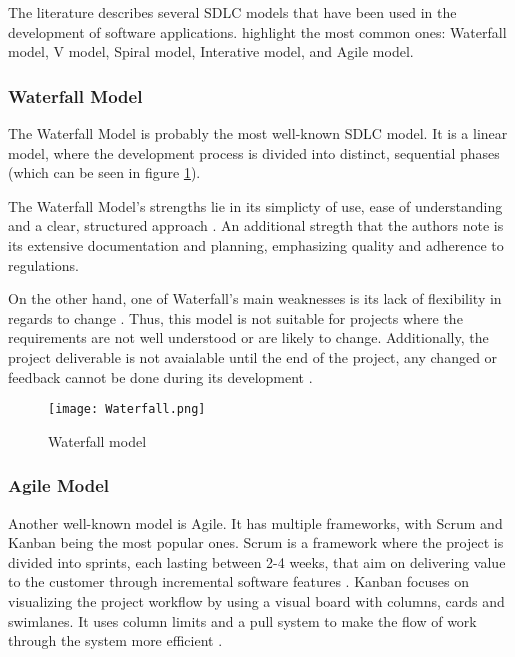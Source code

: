 The literature describes several SDLC models that have been used in the development of software applications. \textcite{sdlc1, sdlc2} highlight the most common ones: Waterfall model, V model, Spiral model, Interative model, and Agile model.

\subsubsection{Waterfall Model}

The Waterfall Model is probably the most well-known SDLC model. It is a linear model, where the development process is divided into distinct, sequential phases (which can be seen in figure \ref{fig:waterfall}).

The Waterfall Model's strengths lie in its simplicty of use, ease of understanding and a clear, structured approach \parencite{waterfall}. An additional stregth that the authors note is its extensive documentation and planning, emphasizing quality and adherence to regulations. 

On the other hand, one of Waterfall's main weaknesses is its lack of flexibility in regards to change \parencite{waterfallno}. Thus, this model is not suitable for projects where the requirements are not well understood or are likely to change. Additionally, the project deliverable is not avaialable until the end of the project, any changed or feedback cannot be done during its development \parencite{waterfallno}.

\begin{figure}[ht]
    \centering
    \texttt{[image: Waterfall.png]}
    \caption{Waterfall model}
    \label{fig:waterfall}
\end{figure}

\subsubsection{Agile Model}

Another well-known model is Agile. It has multiple frameworks, with Scrum and Kanban being the most popular ones. Scrum is a framework where the project is divided into sprints, each lasting between 2-4 weeks, that aim on delivering value to the customer through incremental software features \parencite{scrumban, agile}. Kanban focuses on visualizing the project workflow by using a visual board with columns, cards and swimlanes. It uses column limits and a pull system to make the flow of work through the system more efficient \parencite{agile}.

